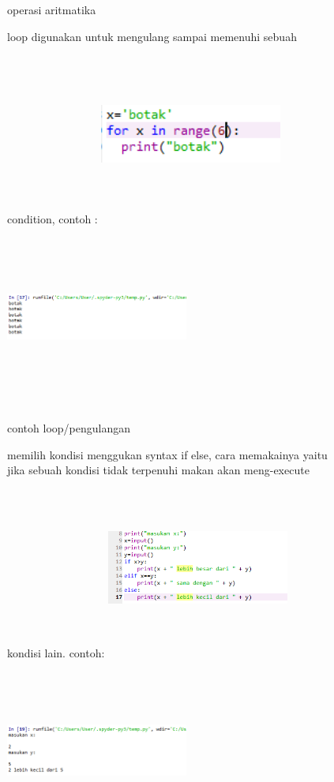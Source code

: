 \begin{enumerate}
\begin{figure}
\caption{operasi aritmatika}
\end{figure}
\begin{figure}
\item loop digunakan untuk mengulang sampai memenuhi sebuah condition, contoh :
\centering
\includegraphics[width=6cm,height=6cm]{figures/c4.png}
\includegraphics[width=6cm,height=6cm]{figures/c5.png}
\caption {contoh loop/pengulangan}
\end{figure}
\begin{figure}
\item memilih kondisi menggukan syntax if else, cara memakainya yaitu jika sebuah kondisi tidak terpenuhi makan akan meng-execute kondisi lain. contoh:
\centering
\includegraphics[width=6cm,height=6cm]{figures/c6.png}
\includegraphics[width=6cm,height=6cm]{figures/c7.png}

\end{figure}
\end{enumerate}
